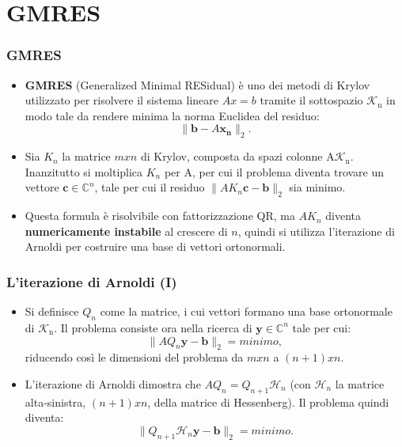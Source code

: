 \documentclass[10pt]{beamer}
\begin{document}
\section{GMRES}\label{sec:sec3}

\begin{frame} \frametitle{GMRES}
\begin{itemize}
    \item \textbf{GMRES} (Generalized Minimal RESidual) è uno dei metodi di Krylov utilizzato per risolvere il sistema lineare $Ax = b$ tramite il sottospazio
    $\mathcal{K}_\mathrm{n}$ in modo tale da rendere minima la norma Euclidea del residuo: $$\|\mathbf{b}-A\mathbf{x_n}\|_2.$$
    
    \item Sia $K_n$ la matrice $m x n$ di Krylov, composta da spazi colonne A$\mathcal{K}_\mathrm{n}$. Inanzitutto si moltiplica $K_n$ per A, per cui il problema diventa trovare un vettore $\mathbf{c}\in\mathbb{C}^n$, tale per cui il residuo $\|AK_n\mathbf{c}-\mathbf{b}\|_2$ sia minimo. 
    
    \item Questa formula è risolvibile con fattorizzazione QR, ma $AK_n$ diventa \textbf{numericamente instabile} al crescere di $n$, quindi si utilizza \alert{l'iterazione di Arnoldi} per costruire una base di vettori ortonormali.

\end{itemize}
\end{frame}

\begin{frame} \frametitle{L'iterazione di Arnoldi (I)}
\begin{itemize}
    \item Si definisce $Q_n$ come la matrice, i cui vettori formano una base ortonormale di $\mathcal{K}_\mathrm{n}$. Il problema consiste ora nella ricerca di $\mathbf{y}\in\mathbb{C}^n$ tale per cui: $$\|AQ_n\mathbf{y}-\mathbf{b}\|_2 = minimo,$$ riducendo così le dimensioni del problema da $m x n$ a $(n+1) x n$.
    
    \item L'iterazione di Arnoldi dimostra che $AQ_n = Q_{n+1}\mathcal{H}_n$ (con $\mathcal{H}_n$ la matrice alta-sinistra, $(n+1) x n$, della matrice di Hessenberg). Il problema quindi diventa:$$\|Q_{n+1}\mathcal{H}_n\mathbf{y}-\mathbf{b}\|_2 = minimo.$$ 
\end{itemize}
\end{frame}
\end{document}

